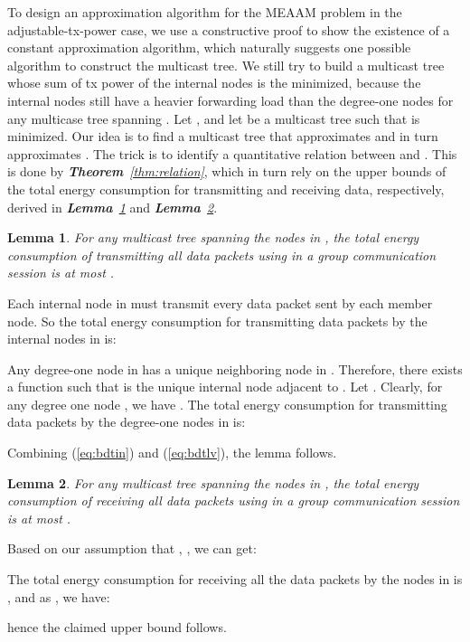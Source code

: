 \documentclass[10pt, conference, compsocconf]{IEEEtran}
\newtheorem{lemma}{\textbf{Lemma}}
\begin{document}
  To design an approximation algorithm for the MEAAM problem in the adjustable-tx-power case, we use a constructive proof to show the existence of a constant approximation algorithm, which naturally suggests one possible algorithm to construct the multicast tree. We still try to build a multicast tree whose sum of tx power of the internal nodes is the minimized, because the internal nodes still have a heavier forwarding load than the degree-one nodes for any multicase tree spanning . Let , and let  be a multicast tree such that  is minimized. Our idea is to find a multicast tree that approximates  and in turn approximates . The trick is to identify a quantitative relation between  and . This is done by \textit{\textbf{Theorem}~\ref{thm:relation}}, which in turn rely on the upper bounds of the total energy consumption for transmitting and receiving data, respectively, derived in \textit{\textbf{Lemma}~\ref{lma:upbdtrans}} and \textit{\textbf{Lemma}~\ref{lma:upbdrecv}}.

  \begin{lemma}
For any multicast tree  spanning the nodes in , the total energy consumption of transmitting all data packets using  in a group communication session is at most .
    \label{lma:upbdtrans}
\end{lemma}
\begin{IEEEproof}
Each internal node in  must transmit every data packet sent by each member node. So the total energy consumption for transmitting data packets by the internal nodes in  is:


    Any degree-one node in  has a unique neighboring node in . Therefore, there exists a function  such that  is the unique internal node adjacent to . Let . Clearly, for any degree one node , we have . The total energy consumption for transmitting data packets by the degree-one nodes in  is:


    Combining (\ref{eq:bdtin}) and (\ref{eq:bdtlv}), the lemma follows.
  \end{IEEEproof}

  \begin{lemma}
For any multicast tree  spanning the nodes in , the total energy consumption of receiving all data packets using  in a group communication session is at most .
    \label{lma:upbdrecv}
\end{lemma}
\begin{IEEEproof}
Based on our assumption that , , we can get:


    The total energy consumption for receiving all the data packets by the nodes in  is , and as , we have:

hence the claimed upper bound follows.
\end{IEEEproof}
\end{document}
